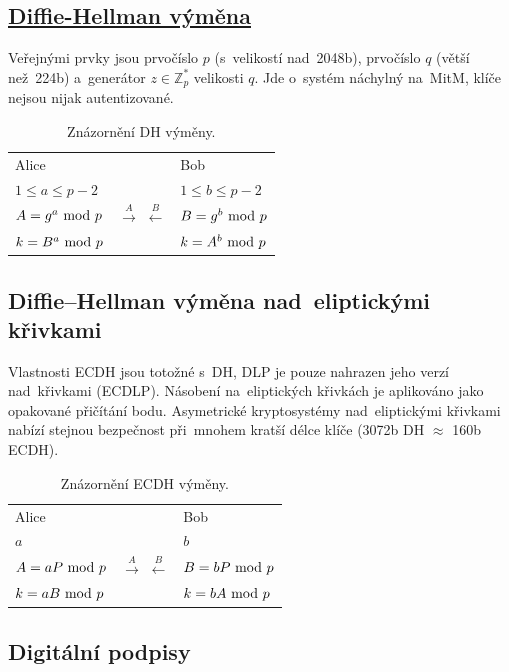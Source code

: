 \subsection[Diffie--Hellman výměna]{\href{https://en.wikipedia.org/wiki/Diffie-Hellman_key_exchange}{Diffie-Hellman výměna}}

Veřejnými prvky jsou prvočíslo $p$ (s~velikostí nad~2048b), prvočíslo $q$ (větší než~224b) a~generátor $z \in \mathbb{Z}_p^*$ velikosti $q$. Jde o~systém náchylný na~MitM, klíče nejsou nijak autentizované.

\begin{table}[ht]
\centering
\begin{tabular}{lcl}
Alice && Bob \\
$1 \le a \le p-2$ && $1 \le b \le p-2$ \\
$A = g^a \ \mathrm{mod}\ p$ & $\stackrel{A}{\rightarrow}$ $\stackrel{B}{\leftarrow}$ & $B = g^b \ \mathrm{mod}\ p$ \\
$k = B^a \ \mathrm{mod}\ p$ && $k = A^b \ \mathrm{mod}\ p$ \\
\end{tabular}
\caption*{Znázornění DH výměny.}
\end{table}

\subsection{Diffie--Hellman výměna nad~eliptickými křivkami}

Vlastnosti ECDH jsou totožné s~DH, DLP je pouze nahrazen jeho verzí nad~křivkami (ECDLP). Násobení na~eliptických křivkách je aplikováno jako opakované přičítání bodu. Asymetrické kryptosystémy nad~eliptickými křivkami nabízí stejnou bezpečnost při~mnohem kratší délce klíče (3072b DH $\approx$ 160b ECDH).

\begin{table}[ht]
\centering
\begin{tabular}{lcl}
Alice && Bob \\
$a$ && $b$ \\
$A = aP \ \mathrm{mod}\ p$ & $\stackrel{A}{\rightarrow}$ $\stackrel{B}{\leftarrow}$ & $B = bP \ \mathrm{mod}\ p$ \\
$k = aB \ \mathrm{mod}\ p$ && $k = bA \ \mathrm{mod}\ p$ \\
\end{tabular}
\caption*{Znázornění ECDH výměny.}
\end{table}

\subsection{Digitální podpisy}

